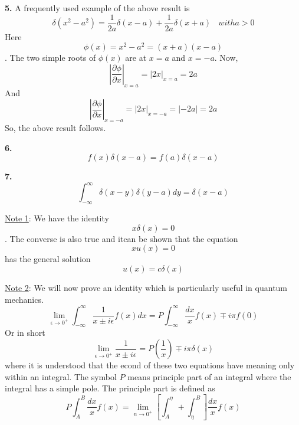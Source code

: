 \textbf{5.} A frequently used example of the above result is $$\delta (x^2 - a^2) = \frac{1}{2a} \delta(x-a) + \frac{1}{2a} \delta(x+a) \ \ \ \ with a>0$$
Here $$\phi (x) = x^2 - a^2 = (x+a)(x-a)$$.
The two simple roots of $\phi(x)$ are at $x=a$ and $x=-a$. Now, $$\left| \frac{\partial \phi}{\partial x} \right|_{x=a} = |2x|_{x=a} = 2a$$ And $$\left| \frac{\partial \phi}{\partial x} \right|_{x=-a} = |2x|_{x=-a} =|-2a|= 2a$$ So, the above result follows.

\textbf{6.} $$f(x) \delta (x-a) = f(a) \delta(x-a)$$

\textbf{7.} $$\int_{-\infty}^{\infty} \delta (x-y) \delta (y-a) dy = \delta (x-a)$$

\underline{Note 1}:
We have the identity $$x \delta(x) = 0$$. The converse is also true and itcan be shown that the equation $$x u(x) = 0$$ has the general solution $$u(x) = c \delta (x)$$

\underline{Note 2}:
We will now prove an identity which is particularly useful in quantum mechanics. $$\lim_{\epsilon \to 0^+} \int_{-\infty}^{\infty} \frac{1}{x \pm i\epsilon} f(x) dx = P \int_{-\infty}^{\infty} \frac{dx}{x} f(x) \mp i\pi f(0)$$
Or in short $$\lim_{\epsilon \to 0^+} \frac{1}{x \pm i\epsilon} = P\left( \frac{1}{x} \right) \mp i \pi \delta (x)$$
where it is understood that the econd of these two equations have meaning only within an integral. The symbol $P$ means principle part of an integral where the integral has a simple pole. The principle part is defined as $$P \int_A^B \frac{dx}{x} f(x)  = \lim_{n \to 0^+} \left[ \int_A^\eta + \int_\eta^B \right] \frac{dx}{x} f(x)$$

